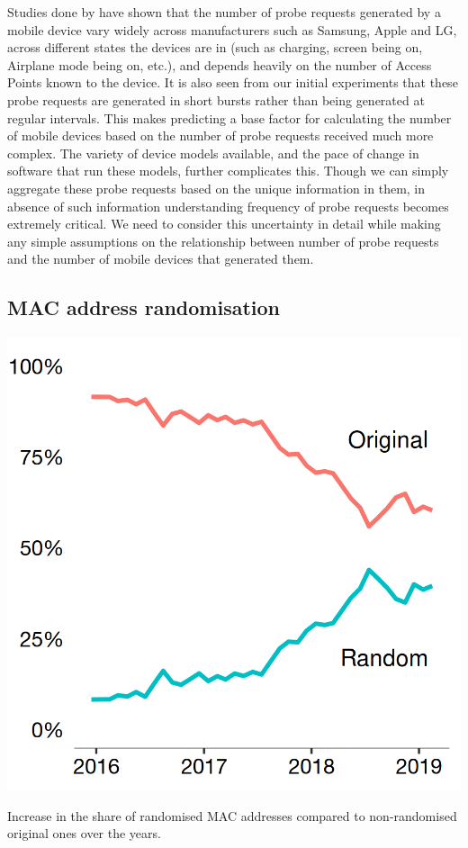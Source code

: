 Studies done by \citet{freud2015}\cite{freud2015} have shown that the number of probe requests generated by a mobile device vary widely across manufacturers such as Samsung, Apple and LG, across different states the devices are in (such as charging, screen being on, Airplane mode being on, etc.), and depends heavily on the number of Access Points known to the device.
It is also seen from our initial experiments that these probe requests are generated in short bursts rather than being generated at regular intervals.
This makes predicting a base factor for calculating the number of mobile devices based on the number of probe requests received much more complex.
The variety of device models available, and the pace of change in software that run these models, further complicates this.
Though we can simply aggregate these probe requests based on the unique information in them, in absence of such information understanding frequency of probe requests becomes extremely critical.
We need to consider this uncertainty in detail while making any simple assumptions on the relationship between number of probe requests and the number of mobile devices that generated them.

\subsection{MAC address randomisation}

\begin{marginfigure}[4cm]
  \includegraphics{images/mac-randomisation.png}
  \caption{Increase in the share of randomised MAC addresses compared to non-randomised original ones over the years.}
  \label{figure:collection:macrandom}
\end{marginfigure}


